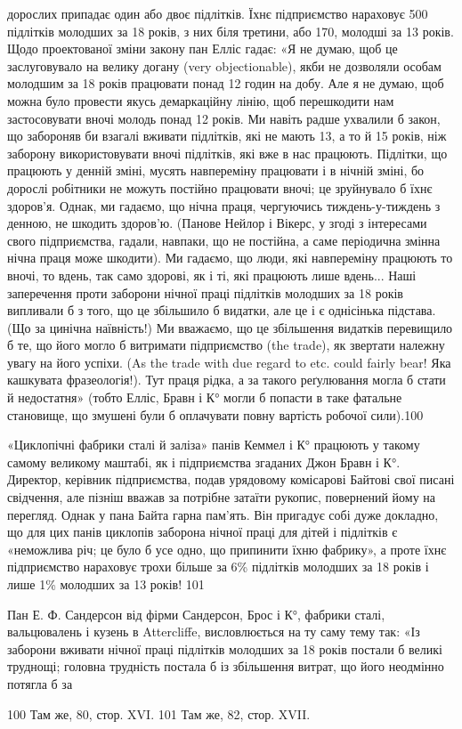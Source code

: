 дорослих припадає один або двоє підлітків. Їхнє підприємство нараховує
500 підлітків молодших за 18 років, з них біля третини,
або 170, молодші за 13 років. Щодо проектованої зміни закону
пан Елліс гадає: «Я не думаю, щоб це заслуговувало на велику
догану (very objectionable), якби не дозволяли особам молодшим
за 18 років працювати понад 12 годин на добу. Але я не думаю,
щоб можна було провести якусь демаркаційну лінію, щоб перешкодити
нам застосовувати вночі молодь понад 12 років. Ми навіть
радше ухвалили б закон, що забороняв би взагалі вживати
підлітків, які не мають 13, а то й 15 років, ніж заборону використовувати
вночі підлітків, які вже в нас працюють. Підлітки,
що працюють у денній зміні, мусять навпереміну працювати і
в нічній зміні, бо дорослі робітники не можуть постійно працювати
вночі; це зруйнувало б їхнє здоров’я. Однак, ми гадаємо,
що нічна праця, чергуючись тиждень-у-тиждень з денною,
не шкодить здоров’ю. (Панове Нейлор і Вікерс, у згоді з інтересами
свого підприємства, гадали, навпаки, що не постійна, а
саме періодична змінна нічна праця може шкодити). Ми гадаємо,
що люди, які навпереміну працюють то вночі, то вдень, так само
здорові, як і ті, які працюють лише вдень... Наші заперечення
проти заборони нічної праці підлітків молодших за 18 років
випливали б з того, що це збільшило б видатки, але це і є однісінька
підстава. (Що за цинічна наївність!) Ми вважаємо, що це
збільшення видатків перевищило б те, що його могло б витримати
підприємство (the trade), як звертати належну увагу на його
успіхи. (As the trade with due regard to etc. could fairly bear!
Яка кашкувата фразеологія!). Тут праця рідка, а за такого реґулювання
могла б стати й недостатня» (тобто Елліс, Бравн і К°
могли б попасти в таке фатальне становище, що змушені були б
оплачувати повну вартість робочої сили).100

«Циклопічні фабрики сталі й заліза» панів Кеммел і К°
працюють у такому самому великому маштабі, як і підприємства
згаданих Джон Бравн і К°. Директор, керівник підприємства,
подав урядовому комісарові Байтові свої писані свідчення, але
пізніш вважав за потрібне затаїти рукопис, повернений йому на
перегляд. Однак у пана Байта гарна пам’ять. Він пригадує собі
дуже докладно, що для цих панів циклопів заборона нічної
праці для дітей і підлітків є «неможлива річ; це було б усе одно,
що припинити їхню фабрику», а проте їхнє підприємство нараховує
трохи більше за 6\% підлітків молодших за 18 років і лише
1\% молодших за 13 років! 101

Пан Е. Ф. Сандерсон від фірми Сандерсон, Брос і К°, фабрики
сталі, вальцювалень і кузень в Attercliffe, висловлюється на ту
саму тему так: «Із заборони вживати нічної праці підлітків молодших
за 18 років постали б великі труднощі; головна трудність
постала б із збільшення витрат, що його неодмінно потягла б за

100 Там же, 80, стор. XVI.
101 Там же, 82, стор. XVII.
